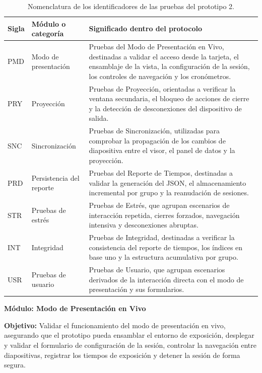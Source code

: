 \documentclass[11pt]{article}
\newcommand{\ttstyle}{%
  \small
  \setlength{\tabcolsep}{6pt}%
  \renewcommand{\arraystretch}{1.25}%
  \arrayrulecolor{azulprofundo}%
}
\newcommand{\hairrule}{%
  \arrayrulecolor{azulregla}\midrule[0.3pt]\arrayrulecolor{azulprofundo}%
}
\begin{document}
\begin{table}[H]
    \centering
    \renewcommand{\arraystretch}{1.2}
    \ttstyle
    \begin{tabularx}{\textwidth}{>{\centering\arraybackslash}p{1.5cm}p{4.6cm}X}
        \toprule
        \textbf{Sigla} & \textbf{Módulo o categoría} & \textbf{Significado dentro del protocolo} \\
        \midrule
        PMD & Modo de presentación & Pruebas del Modo de Presentación en Vivo, destinadas a validar el acceso desde la tarjeta, el ensamblaje de la vista, la configuración de la sesión, los controles de navegación y los cronómetros. \\
        \hairrule
        PRY & Proyección & Pruebas de Proyección, orientadas a verificar la ventana secundaria, el bloqueo de acciones de cierre y la detección de desconexiones del dispositivo de salida. \\
        \hairrule
        SNC & Sincronización & Pruebas de Sincronización, utilizadas para comprobar la propagación de los cambios de diapositiva entre el visor, el panel de datos y la proyección. \\
        \hairrule
        PRD & Persistencia del reporte & Pruebas del Reporte de Tiempos, destinadas a validar la generación del JSON, el almacenamiento incremental por grupo y la reanudación de sesiones. \\
        \hairrule
        STR & Pruebas de estrés & Pruebas de Estrés, que agrupan escenarios de interacción repetida, cierres forzados, navegación intensiva y desconexiones abruptas. \\
        \hairrule
        INT & Integridad & Pruebas de Integridad, destinadas a verificar la consistencia del reporte de tiempos, los índices en base uno y la estructura acumulativa por grupo. \\
        \hairrule
        USR & Pruebas de usuario & Pruebas de Usuario, que agrupan escenarios derivados de la interacción directa con el modo de presentación y sus formularios. \\
        \bottomrule
    \end{tabularx}
    \caption{Nomenclatura de los identificadores de las pruebas del prototipo 2.}
    \label{tab:nomenclatura-pruebas-prototipo-2}
\end{table}

\textbf{Módulo: Modo de Presentación en Vivo}

\textbf{Objetivo:} Validar el funcionamiento del modo de presentación en vivo, asegurando que el prototipo pueda ensamblar el entorno de exposición, desplegar y validar el formulario de configuración de la sesión, controlar la navegación entre diapositivas, registrar los tiempos de exposición y detener la sesión de forma segura.
\end{document}

